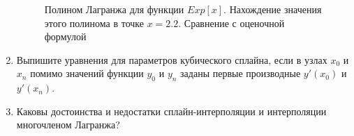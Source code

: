 \documentclass[12pt, a4paper]{article}
\begin{document}
\begin{enumerate}
\begin{figure}[H]
    \caption{Полином Лагранжа для функции $Exp[x]$. Нахождение значения этого полинома в точке $ x = 2.2 $. Сравнение с оценочной формулой}
    \label{fig:misclosure}
\end{figure}

\pagebreak

\item Выпишите уравнения для параметров кубического сплайна, если в узлах $x_0$ и $x_n$ помимо значений функции $y_0$ и $y_n$ заданы первые производные $y'(x_0)$ и $y'(x_n)$.

\item Каковы достоинства и недостатки сплайн-интерполяции и интерполяции многочленом Лагранжа?


\end{enumerate}
\end{document}

